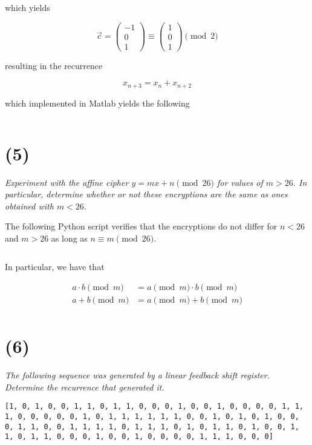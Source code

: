 \documentclass[12pt]{article}
\begin{document}
    which yields

    $$\vec{c} = \begin{pmatrix}-1 \\ 0 \\ 1\end{pmatrix} \equiv \begin{pmatrix}1 \\ 0 \\ 1\end{pmatrix} \pmod{2}$$

    resulting in the recurrence

    $$x_{n + 3} = x_n + x_{n + 2}$$

    which implemented in Matlab yields the following

    \inputminted{matlab}{../snippets/matlab/recurrence.m}

\section*{(5)} \textit{Experiment with the affine cipher $y = m x + n \pmod{26}$ for values of $m > 26$. In particular, determine whether or not these encryptions are the same as ones obtained with $m < 26$.}

    The following Python script verifies that the encryptions do not differ for $n < 26$ and $m > 26$ as long as $n \equiv m \pmod{26}$.

    \inputminted{python}{hw1_affine.py}

    In particular, we have that

    \begin{align*}
        a \cdot b \pmod{m} &= a \pmod{m} \cdot b \pmod{m}\\
        a + b \pmod{m} &= a \pmod{m} + b \pmod{m}\\
    \end{align*}

\section*{(6)} \textit{The following sequence was generated by a linear feedback shift register. Determine the recurrence that generated it.}

    \texttt{[1, 0, 1, 0, 0, 1, 1, 0, 1, 1, 0, 0, 0, 1, 0, 0, 1, 0, 0, 0, 0, 1, 1,
    1, 0, 0, 0, 0, 0, 1, 0, 1, 1, 1, 1, 1, 1, 0, 0, 1, 0, 1, 0, 1, 0, 0,
    0, 1, 1, 0, 0, 1, 1, 1, 1, 0, 1, 1, 1, 0, 1, 0, 1, 1, 0, 1, 0, 0, 1,
    1, 0, 1, 1, 0, 0, 0, 1, 0, 0, 1, 0, 0, 0, 0, 1, 1, 1, 0, 0, 0]}
\end{document}
